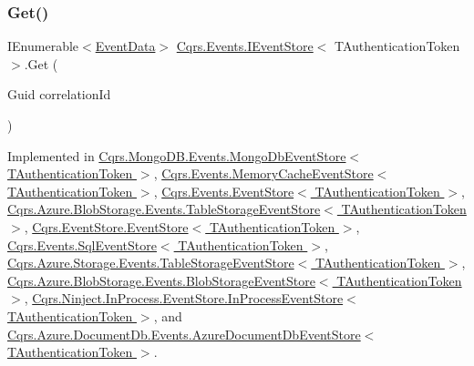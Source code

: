 \subsubsection{\texorpdfstring{Get()}{Get()}\hspace{0.1cm}{\footnotesize\ttfamily [2/2]}}
{\footnotesize\ttfamily I\+Enumerable$<$\hyperlink{classCqrs_1_1Events_1_1EventData}{Event\+Data}$>$ \hyperlink{interfaceCqrs_1_1Events_1_1IEventStore}{Cqrs.\+Events.\+I\+Event\+Store}$<$ T\+Authentication\+Token $>$.Get (\begin{DoxyParamCaption}\item[{Guid}]{correlation\+Id }\end{DoxyParamCaption})}



Implemented in \hyperlink{classCqrs_1_1MongoDB_1_1Events_1_1MongoDbEventStore_ac886ca0a57ad86cb99ef0a3767db9280_ac886ca0a57ad86cb99ef0a3767db9280}{Cqrs.\+Mongo\+D\+B.\+Events.\+Mongo\+Db\+Event\+Store$<$ T\+Authentication\+Token $>$}, \hyperlink{classCqrs_1_1Events_1_1MemoryCacheEventStore_a2a93a3f10423f608527fbc41a7ce8cef_a2a93a3f10423f608527fbc41a7ce8cef}{Cqrs.\+Events.\+Memory\+Cache\+Event\+Store$<$ T\+Authentication\+Token $>$}, \hyperlink{classCqrs_1_1Events_1_1EventStore_a0096646f5dff730b0041b9469719c420_a0096646f5dff730b0041b9469719c420}{Cqrs.\+Events.\+Event\+Store$<$ T\+Authentication\+Token $>$}, \hyperlink{classCqrs_1_1Azure_1_1BlobStorage_1_1Events_1_1TableStorageEventStore_a9b952a9257dc6f458b98eba87684412e_a9b952a9257dc6f458b98eba87684412e}{Cqrs.\+Azure.\+Blob\+Storage.\+Events.\+Table\+Storage\+Event\+Store$<$ T\+Authentication\+Token $>$}, \hyperlink{classCqrs_1_1EventStore_1_1EventStore_a898b51899af27db8aa0fb0c0dc75b25d_a898b51899af27db8aa0fb0c0dc75b25d}{Cqrs.\+Event\+Store.\+Event\+Store$<$ T\+Authentication\+Token $>$}, \hyperlink{classCqrs_1_1Events_1_1SqlEventStore_ac1fb2bdec07cbeec57fb3d985e7a8b31_ac1fb2bdec07cbeec57fb3d985e7a8b31}{Cqrs.\+Events.\+Sql\+Event\+Store$<$ T\+Authentication\+Token $>$}, \hyperlink{classCqrs_1_1Azure_1_1Storage_1_1Events_1_1TableStorageEventStore_a1b436bbb111b14b85ee6ba7f90fb1a35_a1b436bbb111b14b85ee6ba7f90fb1a35}{Cqrs.\+Azure.\+Storage.\+Events.\+Table\+Storage\+Event\+Store$<$ T\+Authentication\+Token $>$}, \hyperlink{classCqrs_1_1Azure_1_1BlobStorage_1_1Events_1_1BlobStorageEventStore_a660c786205693ee34a11e205c6d136ad_a660c786205693ee34a11e205c6d136ad}{Cqrs.\+Azure.\+Blob\+Storage.\+Events.\+Blob\+Storage\+Event\+Store$<$ T\+Authentication\+Token $>$}, \hyperlink{classCqrs_1_1Ninject_1_1InProcess_1_1EventStore_1_1InProcessEventStore_ae07e89f6a8ca48d7d7f25d8a52703fbd_ae07e89f6a8ca48d7d7f25d8a52703fbd}{Cqrs.\+Ninject.\+In\+Process.\+Event\+Store.\+In\+Process\+Event\+Store$<$ T\+Authentication\+Token $>$}, and \hyperlink{classCqrs_1_1Azure_1_1DocumentDb_1_1Events_1_1AzureDocumentDbEventStore_ac59ce599b768ce047869b8ac135f4e22_ac59ce599b768ce047869b8ac135f4e22}{Cqrs.\+Azure.\+Document\+Db.\+Events.\+Azure\+Document\+Db\+Event\+Store$<$ T\+Authentication\+Token $>$}.

